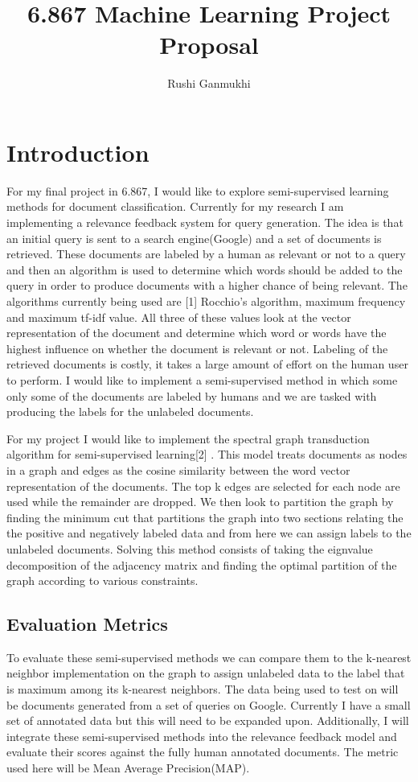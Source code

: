 \documentclass{article} %
\title{6.867 Machine Learning Project Proposal}
\author{
Rushi Ganmukhi \\
}
\begin{document}
\maketitle
\section{Introduction}
For my final project in 6.867, I would like to explore semi-supervised learning methods for document classification.
Currently for my research I am implementing a relevance feedback system for query generation. The idea is that an initial query is sent to a search engine(Google) and a set of documents is retrieved. These documents are labeled by a human as relevant or not to a query and then an algorithm is used to determine which words should be added to the query in order to produce documents with a higher chance of being relevant. The algorithms currently being used are [1] Rocchio's algorithm, maximum frequency and maximum tf-idf value. All three of these values look at the vector representation of the document and determine which word or words have the highest influence on whether the document is relevant or not.  
Labeling of the retrieved documents is costly, it takes a large amount of effort on the human user to perform. I would like to implement a semi-supervised method in which some only some of the documents are labeled by humans and we are tasked with producing the labels for the unlabeled documents. 

For my project I would like to implement the spectral graph transduction algorithm for semi-supervised learning[2] . This model treats documents as nodes in a graph and edges as the cosine similarity between the word vector representation of the documents. The top k edges are selected for each node are used while the remainder are dropped. We then look to partition the graph by finding the minimum cut that partitions the graph into two sections relating the the positive and negatively labeled data and from here we can assign labels to the unlabeled documents. Solving this method consists of taking the eignvalue decomposition of the adjacency matrix and finding the optimal partition of the graph according to various constraints.


\subsection{Evaluation Metrics}
To evaluate these semi-supervised methods we can compare them to the k-nearest neighbor implementation on the graph to assign unlabeled data to the label that is maximum among its k-nearest neighbors. 
The data being used to test on will be documents generated from a set of queries on Google. Currently I have a small set of annotated data but this will need to be expanded upon. 
Additionally, I will integrate these semi-supervised methods into the relevance feedback model and evaluate their scores against the fully human annotated documents. The metric used here will be Mean Average Precision(MAP).
\end{document}
